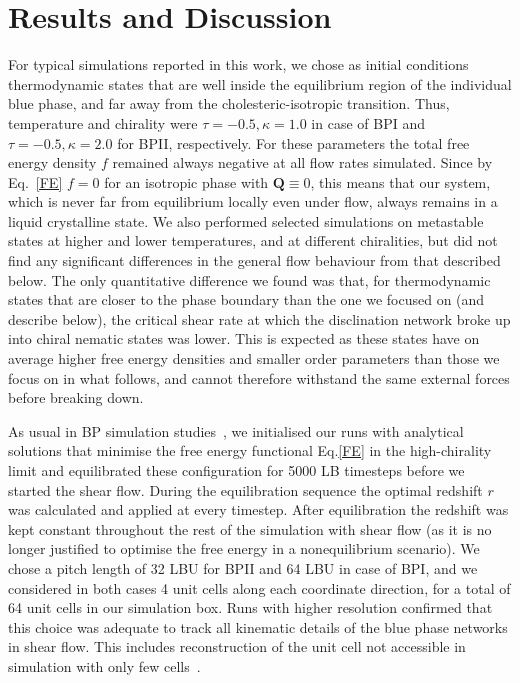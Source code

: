 \documentclass[8.5pt,twoside,twocolumn]{article}
\begin{document}
\section{Results and Discussion}

For typical simulations reported in this work, 
we chose as initial conditions thermodynamic states that are 
well inside the equilibrium region of the individual blue phase, and far away 
from the cholesteric-isotropic transition. Thus, temperature and chirality were 
$\tau=-0.5, \kappa=1.0$ in case of BPI and $\tau=-0.5, \kappa=2.0$ for BPII, respectively.
For these parameters the total free energy density $f$ remained always negative at all flow rates
simulated. 
Since by Eq.~\ref{FE} $f=0$ for an isotropic phase with ${\mathbf Q}\equiv 0$, this means that our system, which is never far from equilibrium locally even under flow, always remains in a liquid crystalline state. 
We also performed selected simulations on metastable states at higher and lower temperatures, 
and at different chiralities, but did not find any significant differences in the 
general flow behaviour from that described below.
The only quantitative difference we found was that, for thermodynamic states that are closer to the phase boundary than the one we focused on (and describe below), the critical shear
rate at which the disclination 
network broke up into chiral nematic states was lower. This is expected as these states have on average higher free energy densities and smaller order parameters than those we focus on in what follows, and cannot therefore withstand the same external forces before breaking down.

As usual in BP simulation studies~\cite{Henrich:2011a,Henrich:2010b}, we initialised our runs with 
analytical solutions that minimise the free energy functional Eq.\ref{FE} in the high-chirality limit 
and equilibrated these configuration for 5000 LB timesteps before we started the shear flow. 
During the equilibration sequence the optimal redshift $r$ was calculated and applied at every timestep.
After equilibration the redshift was kept constant throughout the rest of the simulation with shear flow (as 
it is no longer justified to optimise the free energy in a nonequilibrium scenario).
We chose a pitch length of 32 LBU for BPII and 64 LBU in case of BPI, and we considered in both cases 
4 unit cells along each coordinate direction, for a total of 64 unit cells in our simulation box.
Runs with higher resolution confirmed that this choice was adequate to track  
all kinematic details of the blue phase networks in shear flow. This includes
reconstruction of the unit cell not accessible in simulation with only
few cells~\cite{Dupuis:2005}.
\end{document}
